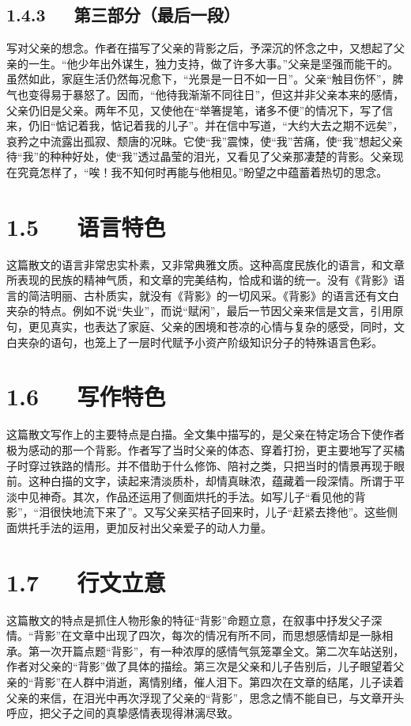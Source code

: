 \documentclass[letterpaper,12pt,english]{sphinxmanual}
\begin{document}
\subsection{1.4.3   第三部分（最后一段）}
\label{\detokenize{p01_u6563_u6587/_u6731_u81ea_u6e05-_u80cc_u5f71:id9}}
写对父亲的想念。作者在描写了父亲的背影之后，予深沉的怀念之中，又想起了父亲的一生。“他少年出外谋生，独力支持，做了许多大事。”父亲是坚强而能干的。虽然如此，家庭生活仍然每况愈下，“光景是一日不如一日”。父亲“触目伤怀”，脾气也变得易于暴怒了。因而，“他待我渐渐不同往日”，但这并非父亲本来的感情，父亲仍旧是父亲。两年不见，又使他在“举箸提笔，诸多不便”的情况下，写了信来，仍旧“惦记着我，惦记着我的儿子”。并在信中写道，“大约大去之期不远矣”，哀矜之中流露出孤寂、颓唐的况昧。它使“我”震悚，使“我”苦痛，使“我”想起父亲待“我”的种种好处，使“我”透过晶莹的泪光，又看见了父亲那凄楚的背影。父亲现在究竟怎样了，“唉！我不知何时再能与他相见。”盼望之中蕴蓄着热切的思念。


\section{1.5   语言特色}
\label{\detokenize{p01_u6563_u6587/_u6731_u81ea_u6e05-_u80cc_u5f71:id10}}
这篇散文的语言非常忠实朴素，又非常典雅文质。这种高度民族化的语言，和文章所表现的民族的精神气质，和文章的完美结构，恰成和谐的统一。没有《背影》语言的简洁明丽、古朴质实，就没有《背影》的一切风采。《背影》的语言还有文白夹杂的特点。例如不说“失业”，而说“赋闲”，最后一节因父亲来信是文言，引用原句，更见真实，也表达了家庭、父亲的困境和苍凉的心情与复杂的感受，同时，文白夹杂的语句，也笼上了一层时代赋予小资产阶级知识分子的特殊语言色彩。


\section{1.6   写作特色}
\label{\detokenize{p01_u6563_u6587/_u6731_u81ea_u6e05-_u80cc_u5f71:id11}}
这篇散文写作上的主要特点是白描。全文集中描写的，是父亲在特定场合下使作者极为感动的那一个背影。作者写了当时父亲的体态、穿着打扮，更主要地写了买橘子时穿过铁路的情形。并不借助于什么修饰、陪衬之类，只把当时的情景再现于眼前。这种白描的文字，读起来清淡质朴，却情真昧浓，蕴藏着一段深情。所谓于平淡中见神奇。其次，作品还运用了侧面烘托的手法。如写儿子“看见他的背影”，“泪很快地流下来了”。又写父亲买桔子回来时，儿子“赶紧去搀他”。这些侧面烘托手法的运用，更加反衬出父亲爱子的动人力量。


\section{1.7   行文立意}
\label{\detokenize{p01_u6563_u6587/_u6731_u81ea_u6e05-_u80cc_u5f71:id12}}
这篇散文的特点是抓住人物形象的特征“背影”命题立意，在叙事中抒发父子深情。“背影”在文章中出现了四次，每次的情况有所不同，而思想感情却是一脉相承。第一次开篇点题“背影”，有一种浓厚的感情气氛笼罩全文。第二次车站送别，作者对父亲的“背影”做了具体的描绘。第三次是父亲和儿子告别后，儿子眼望着父亲的“背影”在人群中消逝，离情别绪，催人泪下。第四次在文章的结尾，儿子读着父亲的来信，在泪光中再次浮现了父亲的“背影”，思念之情不能自已，与文章开头呼应，把父子之间的真挚感情表现得淋漓尽致。
\end{document}
